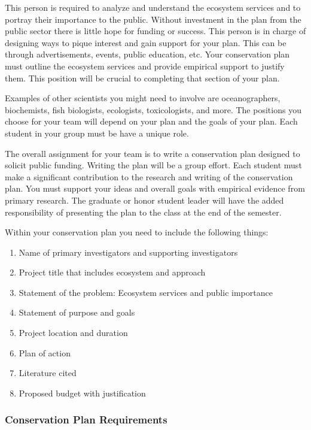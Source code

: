\documentclass[12pt, hidelinks]{exam}
\begin{document}
This person is required to analyze and understand the ecosystem
services and to portray their importance to the public. Without
investment in the plan from the public sector there is little hope for
funding or success. This person is in charge of designing ways to
pique interest and gain support for your plan. This can be through advertisements, events,
public education, etc. Your conservation plan must outline the ecosystem services and provide
empirical support to justify them. This position will be crucial to
completing that section of your plan.

Examples of other scientists you might need to involve are
oceanographers, biochemists, fish biologists, ecologists, toxicologists,
and more. The positions you choose for your team will depend on your plan and the goals of your plan. Each student in your group must be have a unique role.

The overall assignment for your team is to write a conservation plan designed to solicit public funding. Writing the plan will be a group effort. Each student must make a significant contribution
to the research and writing of the conservation plan. You must support your ideas and overall
goals with empirical evidence from primary research. The graduate or honor student leader will have the
added responsibility of presenting the plan to the class at the end of the semester. 

Within your conservation plan you need to include the following things:

\begin{enumerate}
\def\labelenumi{\arabic{enumi}.}
\item
  Name of primary investigators and supporting investigators
\item
  Project title that includes ecosystem and approach
\item
  Statement of the problem: Ecosystem services and public importance
\item
  Statement of purpose and goals
\item
  Project location and duration
\item
  Plan of action
\item
  Literature cited
\item
  Proposed budget with justification
\end{enumerate}


\subsubsection*{Conservation Plan Requirements}
\end{document}
